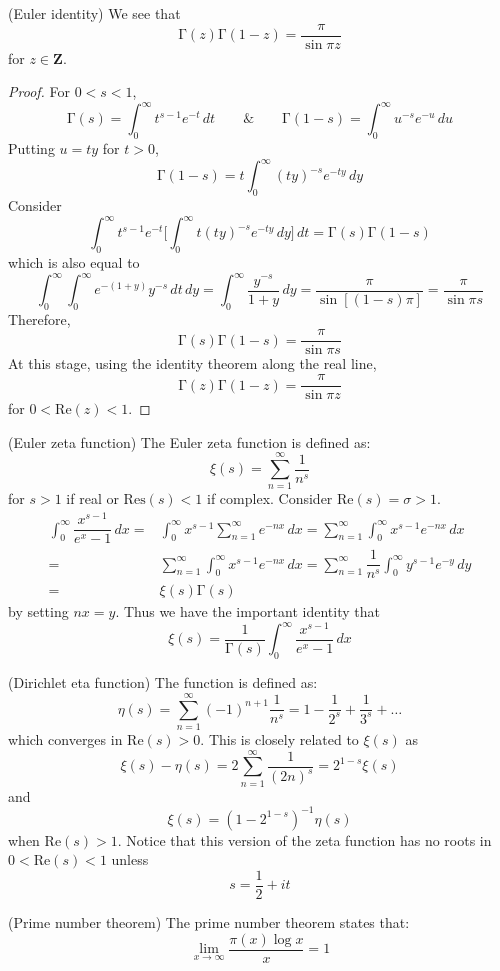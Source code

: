 \vspace{2ex}
\begin{thm}
(Euler identity) We see that
\[\mathrm{\Gamma} (z)\mathrm{\Gamma} (1-z)=\dfrac{\pi }{\sin \pi z} \]
for $z\in {\bm Z}$.
\end{thm}
\vspace{2ex}
\begin{proof}
For $0<s<1$,
\[\mathrm{\Gamma} (s)=\int ^{\infty }_{0}t^{s-1}e^{-t}\,dt\qquad\&\qquad \mathrm{\Gamma} (1-s)=\int ^{\infty }_{0}u^{-s}e^{-u}\,du\]
Putting $u=ty$ for $t>0$,
\[\mathrm{\Gamma} (1-s)=t\int ^{\infty }_{0}(ty)^{-s}e^{-ty}\,dy\]
Consider 
\[\int ^{\infty }_{0}t^{s-1}e^{-t}\Big[\int ^{\infty }_{0}t(ty)^{-s}e^{-ty}\,dy\Big]\,dt=\mathrm{\Gamma} (s)\mathrm{\Gamma} (1-s)\]
which is also equal to
\[\int ^{\infty }_{0}\int ^{\infty }_{0}e^{-(1+y)}y^{-s}\,dt\,dy=\int ^{\infty }_{0}\dfrac{y^{-s}}{1+y}\,dy=\dfrac{\pi }{\sin [(1-s) \pi ]}=\dfrac{\pi }{\sin 	\pi s}\]
Therefore,
\[\mathrm{\Gamma} (s)\mathrm{\Gamma} (1-s)=\dfrac{\pi }{\sin \pi s}\]
At this stage, using the identity theorem along the real line,
\[\mathrm{\Gamma} (z)\mathrm{\Gamma} (1-z)=\dfrac{\pi }{\sin \pi z}\]
for $0<\mathrm{Re}(z)<1$. 
\end{proof}
\vspace{2ex}
\begin{defi}
(Euler zeta function) The Euler zeta function is defined as:
\[\xi (s)=\sum ^{\infty }_{n=1}\dfrac{1}{n^{s}}\]
for $s>1$ if real or $\mathrm{Res}(s)<1$ if complex. Consider $\mathrm{Re}(s)=\sigma >1$.
\[\begin{align*}
\int ^{\infty }_{0}\dfrac{x^{s-1}}{e^{x}-1}\,dx=&\int ^{\infty }_{0}x^{s-1}\sum ^{\infty }_{n=1}e^{-nx}\,dx=\sum ^{\infty }_{n=1}\int ^{\infty }_{0}x^{s-1}e^{-nx}\,dx\\=&\sum ^{\infty }_{n=1}\int ^{\infty }_{0}x^{s-1}e^{-nx}\,dx
=\sum ^{\infty }_{n=1}\dfrac{1}{n^{s}}\int ^{\infty }_{0}y^{s-1}e^{-y}\,dy\\
=&\xi (s)\mathrm{\Gamma} (s)
\end{align*}\]
by setting $nx=y$. Thus we have the important identity that
\[\xi (s)=\dfrac{1}{\mathrm{\Gamma} (s)}\int ^{\infty }_{0}\dfrac{x^{s-1}}{e^{x}-1}\,dx\]
\end{defi}
\vspace{2ex}
\begin{defi}
(Dirichlet eta function) The function is defined as:
\[\eta (s)=\sum ^{\infty }_{n=1}(-1)^{n+1}\dfrac{1}{n^{s}}=1-\dfrac{1}{2^{s}}+\dfrac{1}{3^{s}}+\ldots \]
which converges in $\mathrm{Re}(s)>0$. This is closely related to $\xi (s)$ as 
\[\xi (s)-\eta (s)=2\sum ^{\infty }_{n=1}\dfrac{1}{(2n)^{s}}=2^{1-s}\xi (s)\]
and 
\[\xi (s)=(1-2^{1-s})^{-1}\eta (s)\]
when $\mathrm{Re}(s)>1$. Notice that this version of the zeta function has no roots in $0<\mathrm{Re}(s)<1$ unless
\[s=\dfrac{1}{2}+it\]
\end{defi}
\vspace{2ex}
\begin{lem}
(Prime number theorem) The prime number theorem states that:
\[\lim _{x\rightarrow \infty }\dfrac{\pi (x)\log x}{x}=1\]
\end{lem}
\vspace{2ex}

